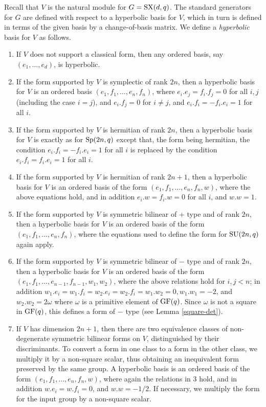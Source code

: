 \documentclass[12pt]{article}
\def\GF{{\rm GF}}
\def\Sp{{\rm Sp}}
\def\SU{{\rm SU}}
\def\SX{{\rm SX}}
\begin{document}
Recall that $V$ is the natural module for $G = \SX(d, q)$.
The standard generators for $G$ are defined with respect to 
a hyperbolic basis for $V$, which in turn is defined 
in terms of the given basis by a change-of-basis matrix. 
We define a {\it hyperbolic} basis for $V$ as follows. 
\begin{enumerate}
\item 
If $V$ does not support a classical form, then any ordered basis, 
say $(e_1, \ldots, e_d)$, is hyperbolic. 

\item 
If the form supported by $V$ is symplectic of rank $2n$, then 
a hyperbolic basis for 
$V$ is an ordered basis $(e_1,f_1,\ldots,e_n,f_n)$, where
$e_i.e_j=f_i.f_j=0$ for all $i,j$ (including the case $i=j$), and
$e_i.f_j=0$ for $i\ne j$, and $e_i.f_i=-f_i.e_i=1$ for all $i$. 

\item 
If the form supported by $V$ is hermitian of rank $2n$, then a hyperbolic 
basis for $V$ is exactly as
for $\Sp(2n,q)$ except that, the form being hermitian, the
condition  $e_i.f_i=-f_i.e_i=1$ for all $i$ is replaced by the
condition $e_i.f_i=f_i.e_i=1$ for all $i$. 

\item 
If the form supported by $V$ is hermitian of rank $2n + 1$, 
then a hyperbolic basis for $V$ is 
an ordered basis of the form 
$(e_1,f_1,\ldots,e_n,f_n,w)$, where the above equations hold, and in
addition $e_i.w=f_i.w=0$ for all $i$, and $w.w=1$. 

\item 
If the form supported by $V$ is symmetric bilinear 
of $+$ type and of rank $2n$, 
then a hyperbolic basis  for  $V$ is  an
ordered  basis  of the  form $(e_1,f_1,\ldots,e_n,f_n)$, where the
equations used to define the form for $\SU(2n,q)$ again apply.

\item  
If the form supported by $V$ is symmetric bilinear of  
$-$ type and of rank $2n$, 
then  a hyperbolic  basis for $V$  is an
  ordered  basis  of  the form
  $(e_1,f_1,\ldots,e_{n-1},f_{n-1},w_1,w_2)$,  where  the  above
  relations hold for  $i, j <n$; in addition
  $w_1.e_i=w_1.f_i=w_2.e_i=w_2.f_i=w_1.w_2=0, w_1.w_1=-2$,  and
  $w_2.w_2=2\omega$  where  $\omega$ is  a primitive  element of
  $\GF(q)$.  Since $\omega$ is not a square in
  $\GF(q)$, this defines a form of $-$ type (see Lemma \ref{square-det}).

\item  
If $V$ has dimension $2n+1$, then there are two equivalence classes
of non-degenerate symmetric bilinear forms on $V$, distinguished by their
discriminants. To convert a form in one class to a form in
the other class, we multiply it by a non-square scalar, 
thus obtaining an inequivalent form preserved by the same group.  
A hyperbolic
basis is an ordered basis of the form $(e_1,f_1,\ldots,e_n,f_n,w)$, where
again the relations in 3 hold, and in addition $w.e_i=w.f_i=0$, and
$w.w=-1/2$.  
If necessary, we multiply the form for the input group by a non-square scalar.
\end{enumerate}
\end{document}
